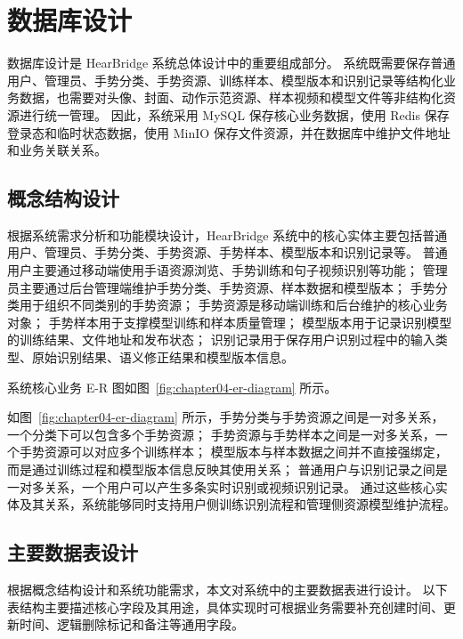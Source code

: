 
\section{数据库设计}

数据库设计是 HearBridge 系统总体设计中的重要组成部分。
系统既需要保存普通用户、管理员、手势分类、手势资源、训练样本、模型版本和识别记录等结构化业务数据，也需要对头像、封面、动作示范资源、样本视频和模型文件等非结构化资源进行统一管理。
因此，系统采用 MySQL 保存核心业务数据，使用 Redis 保存登录态和临时状态数据，使用 MinIO 保存文件资源，并在数据库中维护文件地址和业务关联关系。

\subsection{概念结构设计}

根据系统需求分析和功能模块设计，HearBridge 系统中的核心实体主要包括普通用户、管理员、手势分类、手势资源、手势样本、模型版本和识别记录等。
普通用户主要通过移动端使用手语资源浏览、手势训练和句子视频识别等功能；
管理员主要通过后台管理端维护手势分类、手势资源、样本数据和模型版本；
手势分类用于组织不同类别的手势资源；
手势资源是移动端训练和后台维护的核心业务对象；
手势样本用于支撑模型训练和样本质量管理；
模型版本用于记录识别模型的训练结果、文件地址和发布状态；
识别记录用于保存用户识别过程中的输入类型、原始识别结果、语义修正结果和模型版本信息。

系统核心业务 E-R 图如图~\ref{fig:chapter04-er-diagram} 所示。


如图~\ref{fig:chapter04-er-diagram} 所示，手势分类与手势资源之间是一对多关系，一个分类下可以包含多个手势资源；
手势资源与手势样本之间是一对多关系，一个手势资源可以对应多个训练样本；
模型版本与样本数据之间并不直接强绑定，而是通过训练过程和模型版本信息反映其使用关系；
普通用户与识别记录之间是一对多关系，一个用户可以产生多条实时识别或视频识别记录。
通过这些核心实体及其关系，系统能够同时支持用户侧训练识别流程和管理侧资源模型维护流程。

\subsection{主要数据表设计}

根据概念结构设计和系统功能需求，本文对系统中的主要数据表进行设计。
以下表结构主要描述核心字段及其用途，具体实现时可根据业务需要补充创建时间、更新时间、逻辑删除标记和备注等通用字段。

